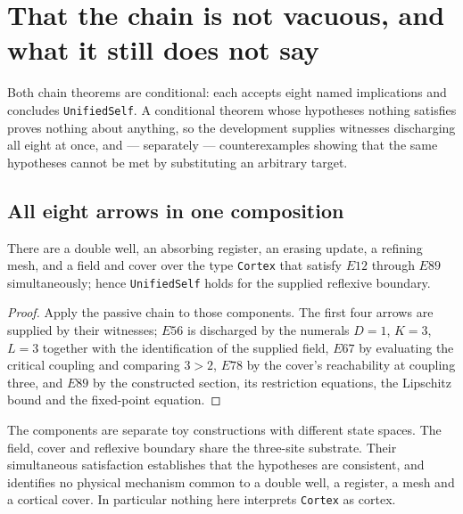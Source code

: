 \section{That the chain is not vacuous, and what it still does not say}
\label{sec:satisfiability}
Both chain theorems are conditional: each accepts eight named implications and
concludes \texttt{UnifiedSelf}. A conditional theorem whose hypotheses nothing
satisfies proves nothing about anything, so the development supplies witnesses
discharging all eight at once, and --- separately --- counterexamples showing
that the same hypotheses cannot be met by substituting an arbitrary target.

\subsection{All eight arrows in one composition}
\begin{claim}
There are a double well, an absorbing register, an erasing update, a refining
mesh, and a field and cover over the type \texttt{Cortex} that satisfy $E12$
through $E89$ simultaneously; hence \texttt{UnifiedSelf} holds for the supplied
reflexive boundary.
\end{claim}
\begin{proof}
Apply the passive chain to those components. The first four arrows are supplied
by their witnesses; $E56$ is discharged by the numerals $D=1$, $K=3$, $L=3$
together with the identification of the supplied field, $E67$ by evaluating the
critical coupling and comparing $3>2$, $E78$ by the cover's reachability at
coupling three, and $E89$ by the constructed section, its restriction equations,
the Lipschitz bound and the fixed-point equation.
\end{proof}
\scope The components are separate toy constructions with different state spaces.
The field, cover and reflexive boundary share the three-site substrate.
Their simultaneous satisfaction establishes that the hypotheses are consistent,
and identifies no physical mechanism common to a double well, a register, a mesh
and a cortical cover. In particular nothing here interprets \texttt{Cortex} as
cortex.

